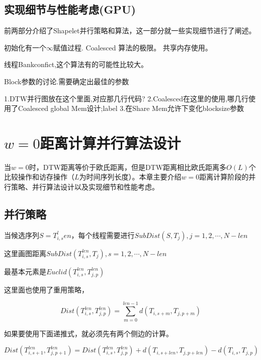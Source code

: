 \subsection{实现细节与性能考虑(GPU)}

前两部分介绍了Shapelet并行策略和算法，这一部分就一些实现细节进行了阐述。

初始化有一个$\infty$赋值过程.
Coalesced
算法的极限。
共享内存使用。

线程Bankconfict,这个算法有的可能性比较大。

Block参数的讨论.需要确定出最佳的参数

1.DTW并行图放在这个里面,对应那几行代码?
2.Coalesced在这里的使用,哪几行使用了Coalesced
global Mem设计;label
3.在Share Mem允许下变化blocksize参数

{\color{red}{Trick部分还可以体现一下DTW的多线程运行}}

\section{$w=0$距离计算并行算法设计}
\label{cha:myalg:euclid}

当$w=0$时，DTW距离等价于欧氏距离，但是DTW距离相比欧氏距离多$O(L)$个比较操作和访存操作（$L$为时间序列长度）。本章主要介绍$w=0$距离计算阶段的并行策略、并行算法设计以及实现细节和性能考虑。

\subsection{并行策略}

当候选序列$S=T_{i,s}^len$，每个线程需要进行$SubDist(S,T_j),j=1,2,\cdots,N-len$

这里画图距离$SubDist(T_{i,s}^{len},T_j),s=1,2,\cdots,N-len$

最基本元素是$Euclid(T_{i,s}^{len},T_{j,p}^{len})$

这里面也使用了重用策略，

{}

\begin{equation}
\label{equ:chap04:eucliddef}
Dist(T_{i,s}^{len},T_{j,p}^{len}) = \sum_{m=0}^{len-1}d(T_{i,s+m},T_{j,p+m})
\end{equation}

如果要使用下面递推式，就必须先有两个侧边的计算。

\begin{equation}
\label{equ:chap04:euclid}
Dist(T_{i,s+1}^{len},T_{j,p+1}^{len}) = Dist(T_{i,s}^{len},T_{j,p}^{len}) + d(T_{i,s+len},T_{j,p+len}) - d(T_{i,s},T_{j,p})
\end{equation}
{\color{red}{上面图指一下位置,侧边计算}}

